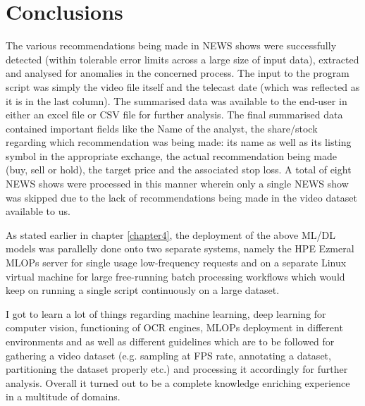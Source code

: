 \chapter{Conclusions} \label{chapter6}

The various recommendations being made in NEWS shows were successfully detected (within tolerable error limits across a large size of input data), extracted and analysed for anomalies in the concerned process.  The input to the program script was simply the video file itself and the telecast date (which was reflected as it is in the last column). The summarised data was available to the end-user in either an excel file or CSV file for further analysis. The final summarised data contained important fields like the Name of the analyst, the share/stock regarding which recommendation was being made: its name as well as its listing symbol in the appropriate exchange, the actual recommendation being made (buy, sell or hold), the target price and the associated stop loss.  A total of eight NEWS shows were processed in this manner wherein only a single NEWS show was skipped due to the lack of recommendations being made in the video dataset available to us. \par

As stated earlier in chapter \ref{chapter4}, the deployment of the above ML/DL models was parallelly done onto two separate systems, namely the HPE Ezmeral MLOPs server for single usage low-frequency requests and on a separate Linux virtual machine for large free-running batch processing workflows which would keep on running a single script continuously on a large dataset. \par

I got to learn a lot of things regarding machine learning, deep learning for computer vision, functioning of OCR engines, MLOPs deployment in different environments and as well as different guidelines which are to be followed for gathering a video dataset (e.g. sampling at FPS rate, annotating a dataset, partitioning the dataset properly etc.) and processing it accordingly for further analysis. Overall it turned out to be a complete knowledge enriching experience in a multitude of domains.

